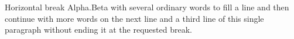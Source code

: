 \documentclass{beamer}
\begin{document}
\begin{frame}[allowframebreaks]{Horizontal break}
Alpha.\framebreak Beta with several ordinary words to fill a line and then continue with more words on the next line and a third line of this single paragraph without ending it at the requested break.
\end{frame}
\end{document}
